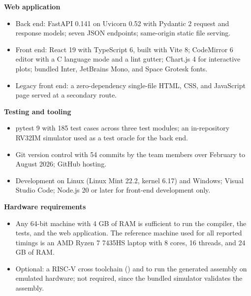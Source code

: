 \textbf{Web application}
\begin{itemize}
  \item Back end: FastAPI 0.141 on Uvicorn 0.52 with Pydantic 2 request and response models; seven JSON endpoints; same-origin static file serving.
  \item Front end: React 19 with TypeScript 6, built with Vite 8; CodeMirror 6 editor with a C language mode and a lint gutter; Chart.js 4 for interactive plots; bundled Inter, JetBrains Mono, and Space Grotesk fonts.
  \item Legacy front end: a zero-dependency single-file HTML, CSS, and JavaScript page served at a secondary route.
\end{itemize}

\textbf{Testing and tooling}
\begin{itemize}
  \item pytest 9 with 185 test cases across three test modules; an in-repository RV32IM simulator used as a test oracle for the back end.
  \item Git version control with 54 commits by the team members over February to August 2026; GitHub hosting.
  \item Development on Linux (Linux Mint 22.2, kernel 6.17) and Windows; Visual Studio Code; Node.js 20 or later for front-end development only.
\end{itemize}

\textbf{Hardware requirements}
\begin{itemize}
  \item Any 64-bit machine with 4 GB of RAM is sufficient to run the compiler, the tests, and the web application. The reference machine used for all reported timings is an AMD Ryzen 7 7435HS laptop with 8 cores, 16 threads, and 24 GB of RAM.
  \item Optional: a RISC-V cross toolchain () and  to run the generated assembly on emulated hardware; not required, since the bundled simulator validates the assembly.
\end{itemize}

